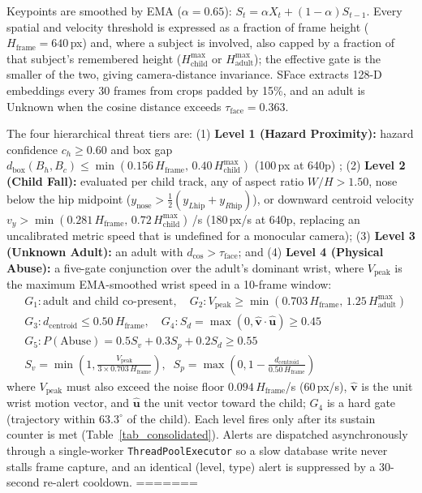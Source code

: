 \documentclass[conference]{IEEEtran}
\begin{document}
Keypoints are smoothed by EMA ($\alpha = 0.65$): $S_t = \alpha X_t + (1 - \alpha) S_{t-1}$. Every spatial and velocity threshold is expressed as a fraction of frame height ($H_{\text{frame}} = 640$\,px) and, where a subject is involved, also capped by a fraction of that subject's remembered height ($H_{\text{child}}^{\max}$ or $H_{\text{adult}}^{\max}$); the effective gate is the smaller of the two, giving camera-distance invariance. SFace \cite{b19} extracts 128-D embeddings every 30 frames from crops padded by 15\%, and an adult is Unknown when the cosine distance exceeds $\tau_{\text{face}} = 0.363$.

The four hierarchical threat tiers are: (1) \textbf{Level 1 (Hazard Proximity):} hazard confidence $c_h \ge 0.60$ and box gap $d_{\text{box}}(B_h, B_c) \le \min(0.156\,H_{\text{frame}},\, 0.40\,H_{\text{child}}^{\max})$ (100\,px at 640p) \cite{b15}; (2) \textbf{Level 2 (Child Fall):} evaluated per child track, any of aspect ratio $W/H > 1.50$, nose below the hip midpoint ($y_{\text{nose}} > \tfrac{1}{2}(y_{L\text{hip}} + y_{R\text{hip}})$), or downward centroid velocity $v_y > \min(0.281\,H_{\text{frame}},\, 0.72\,H_{\text{child}}^{\max})$\,/s (180\,px/s at 640p, replacing an uncalibrated metric speed that is undefined for a monocular camera); (3) \textbf{Level 3 (Unknown Adult):} an adult with $d_{\cos} > \tau_{\text{face}}$; and (4) \textbf{Level 4 (Physical Abuse):} a five-gate conjunction over the adult's dominant wrist, where $V_{\text{peak}}$ is the maximum EMA-smoothed wrist speed in a 10-frame window:
\begin{align}
&G_1: \text{adult and child co-present}, \quad G_2: V_{\text{peak}} \ge \min(0.703\,H_{\text{frame}},\, 1.25\,H_{\text{adult}}^{\max}) \nonumber\\
&G_3: d_{\text{centroid}} \le 0.50\,H_{\text{frame}}, \quad G_4: S_d = \max(0, \hat{\mathbf{v}}\!\cdot\!\hat{\mathbf{u}}) \ge 0.45 \label{eq6}\\
&G_5: P(\text{Abuse}) = 0.5 S_v + 0.3 S_p + 0.2 S_d \ge 0.55 \nonumber\\
&S_v = \min\!\left(1, \tfrac{V_{\text{peak}}}{3 \times 0.703\,H_{\text{frame}}}\right), \;\; S_p = \max\!\left(0, 1 - \tfrac{d_{\text{centroid}}}{0.50\,H_{\text{frame}}}\right) \nonumber
\end{align}
where $V_{\text{peak}}$ must also exceed the noise floor $0.094\,H_{\text{frame}}$/s (60\,px/s), $\hat{\mathbf{v}}$ is the unit wrist motion vector, and $\hat{\mathbf{u}}$ the unit vector toward the child; $G_4$ is a hard gate (trajectory within $63.3^{\circ}$ of the child). Each level fires only after its sustain counter is met (Table~\ref{tab_consolidated}). Alerts are dispatched asynchronously through a single-worker \texttt{ThreadPoolExecutor} so a slow database write never stalls frame capture, and an identical (level, type) alert is suppressed by a 30-second re-alert cooldown.
=======
\end{document}
